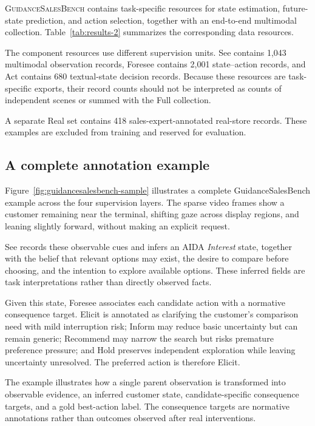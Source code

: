 \documentclass{article}
\begin{document}
\textsc{GuidanceSalesBench} contains task-specific resources for
state estimation, future-state prediction, and action selection,
together with an end-to-end multimodal collection.
Table~\ref{tab:results-2} summarizes the corresponding data
resources.

The component resources use different supervision units.
See contains 1,043 multimodal observation records, Foresee contains
2,001 state--action records, and Act contains 680 textual-state
decision records. Because these resources are task-specific exports,
their record counts should not be interpreted as counts of independent
scenes or summed with the Full collection.

A separate Real set contains 418 sales-expert-annotated real-store
records. These examples are excluded from training and reserved for
evaluation.

\subsection{A complete annotation
example}\label{a-complete-annotation-example}

Figure~\ref{fig:guidancesalesbench-sample} illustrates a complete GuidanceSalesBench example across the four supervision layers. The sparse video frames show a customer remaining near the terminal, shifting gaze across display regions, and leaning slightly forward, without making an explicit request.

See records these observable cues and infers an AIDA \textit{Interest} state, together with the belief that relevant options may exist, the desire to compare before choosing, and the intention to explore available options. These inferred fields are task interpretations rather than directly observed facts.

Given this state, Foresee associates each candidate action with a normative consequence target. Elicit is annotated as clarifying the customer's comparison need with mild interruption risk; Inform may reduce basic uncertainty but can remain generic; Recommend may narrow the search but risks premature preference pressure; and Hold preserves independent exploration while leaving uncertainty unresolved. The preferred action is therefore Elicit.

The example illustrates how a single parent observation is transformed into observable evidence, an inferred customer state, candidate-specific consequence targets, and a gold best-action label. The consequence targets are normative annotations rather than outcomes observed after real interventions.
\end{document}
